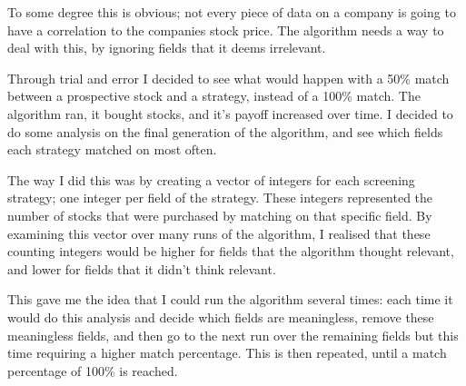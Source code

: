 To some degree this is obvious; not every piece of data on a company is going to have a correlation to the companies stock price. The algorithm needs a way to deal with this, by ignoring fields that it deems irrelevant. \newline

Through trial and error I decided to see what would happen with a 50\% match between a prospective stock and a strategy, instead of a 100\% match. The algorithm ran, it bought stocks, and it's payoff increased over time. I decided to do some analysis on the final generation of the algorithm, and see which fields each strategy matched on most often. \newline

The way I did this was by creating a vector of integers for each screening strategy; one integer per field of the strategy. These integers represented the number of stocks that were purchased by matching on that specific field. By examining this vector over many runs of the algorithm, I realised that these counting integers would be higher for fields that the algorithm thought relevant, and lower for fields that it didn't think relevant. \newline

This gave me the idea that I could run the algorithm several times: each time it would do this analysis and decide which fields are meaningless, remove these meaningless fields, and then go to the next run over the remaining fields but this time requiring a higher match percentage. This is then repeated, until a match percentage of 100\% is reached.

